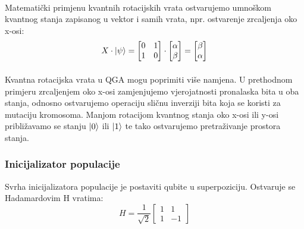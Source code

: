 \documentclass[times, utf8, zavrsni, numeric]{fer}
\begin{document}
\paragraph{}
Matematički primjenu kvantnih rotacijskih vrata ostvarujemo umnoškom kvantnog stanja zapisanog u vektor i samih vrata, npr. ostvarenje zrcaljenja oko x-osi:
\begin{equation}
X\cdot \ket{\psi} = 
\begin{bmatrix}
0 & 1 \\ 1 & 0
\end{bmatrix} \cdot
\begin{bmatrix}
\alpha \\ \beta
\end{bmatrix}
= \begin{bmatrix}
\beta \\ \alpha
\end{bmatrix}
\end{equation}

\paragraph{}
Kvantna rotacijska vrata u QGA mogu poprimiti više namjena. U prethodnom primjeru zrcaljenjem oko x-osi zamjenjujemo vjerojatnosti pronalaska bita u oba stanja, odnosno ostvarujemo operaciju sličnu inverziji bita koja se koristi za mutaciju kromosoma. Manjom rotacijom kvantnog stanja oko x-osi ili y-osi približavamo se stanju $\ket{0}$ ili $\ket{1}$ te tako ostvarujemo pretraživanje prostora stanja.

\subsubsection{Inicijalizator populacije}
Svrha inicijalizatora populacije je postaviti qubite u superpoziciju. Ostvaruje se Hadamardovim H vratima:
\begin{equation}
H = \frac{1}{\sqrt{2}}
\begin{bmatrix}
1 & 1 \\ 1 & -1
\end{bmatrix} 
\end{equation}
\end{document}

